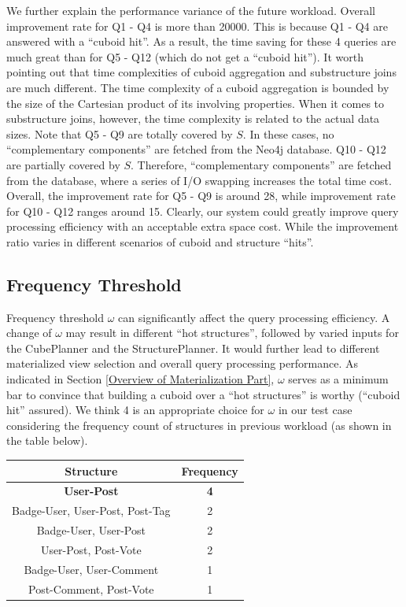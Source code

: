 We further explain the performance variance of the future workload. Overall improvement rate for Q1 - Q4 is more than 20000. This is because Q1 - Q4 are answered with a ``cuboid hit''. As a result, the time saving for these 4 queries are much great than for Q5 - Q12 (which do not get a ``cuboid hit''). It worth pointing out that time complexities of cuboid aggregation and substructure joins are much different. The time complexity of a cuboid aggregation is bounded by the size of the Cartesian product of its involving properties. When it comes to substructure joins, however, the time complexity is related to the actual data sizes. Note that Q5 - Q9 are totally covered by $S$. In these cases, no ``complementary components'' are fetched from the Neo4j database.  Q10 - Q12 are partially covered by $S$.  Therefore, ``complementary components'' are fetched from the database, where a series of I/O swapping increases the total time cost.  Overall, the improvement rate for Q5 - Q9 is around 28, while improvement rate for Q10 - Q12 ranges around 15. Clearly, our system could greatly improve query processing efficiency with an acceptable extra space cost. While the improvement ratio varies in different scenarios of cuboid and structure ``hits''.




\subsection{Frequency Threshold}
\label{Frequency Threshold}
Frequency threshold $\omega$ can significantly affect the query processing efficiency. A change of $\omega$ may result in different ``hot structures'', followed by varied inputs for the CubePlanner and the StructurePlanner. It would further lead to different materialized view selection and overall query processing performance. As indicated in Section \ref{Overview of Materialization Part}, $\omega$ serves as a minimum bar to convince that building a cuboid over a ``hot structures'' is worthy (``cuboid hit'' assured). We think 4 is an appropriate choice for $\omega$ in our test case considering the frequency count of structures in previous workload (as shown in the table below).

\begin{center}
	\begin{tabular}{ | c | c |}
		\hline
		Structure	&Frequency	\\ \hline
		\textbf{User-Post} 	&\textbf{4} \\ \hline
		Badge-User, User-Post, Post-Tag 	&2 \\ \hline
		Badge-User, User-Post	&2 \\ \hline
		User-Post, Post-Vote	&2 \\ \hline
		Badge-User, User-Comment	&1 \\ \hline
		Post-Comment, Post-Vote	&1 \\ \hline
	\end{tabular}
	\end {center}
	

